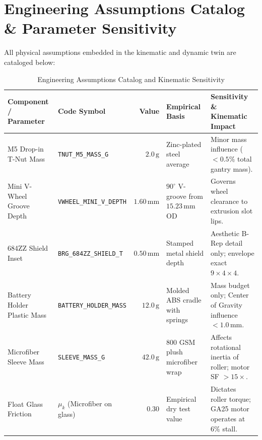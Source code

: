 \documentclass[10pt,a4paper]{article}
\begin{document}
\section{Engineering Assumptions Catalog \& Parameter Sensitivity}

All physical assumptions embedded in the kinematic and dynamic twin are cataloged below:

\begin{table}[H]
\centering
\small
\begin{tabularx}{\textwidth}{p{4.2cm} p{3.5cm} r p{4.2cm} X}
\toprule
\textbf{Component / Parameter} & \textbf{Code Symbol} & \textbf{Value} & \textbf{Empirical Basis} & \textbf{Sensitivity \& Kinematic Impact} \\
\midrule
M5 Drop-in T-Nut Mass & \texttt{TNUT\_M5\_MASS\_G} & $2.0\,\text{g}$ & Zinc-plated steel average & Minor mass influence ($<0.5\%$ total gantry mass). \\
Mini V-Wheel Groove Depth & \texttt{VWHEEL\_MINI\_V\_DEPTH} & $1.60\,\text{mm}$ & $90^\circ$ V-groove from $15.23\,\text{mm}$ OD & Governs wheel clearance to extrusion slot lips. \\
684ZZ Shield Inset & \texttt{BRG\_684ZZ\_SHIELD\_T} & $0.50\,\text{mm}$ & Stamped metal shield depth & Aesthetic B-Rep detail only; envelope exact $9 \times 4 \times 4$. \\
Battery Holder Plastic Mass & \texttt{BATTERY\_HOLDER\_MASS} & $12.0\,\text{g}$ & Molded ABS cradle with springs & Mass budget only; Center of Gravity influence $<1.0\,\text{mm}$. \\
Microfiber Sleeve Mass & \texttt{SLEEVE\_MASS\_G} & $42.0\,\text{g}$ & 800 GSM plush microfiber wrap & Affects rotational inertia of roller; motor SF $>15\times$. \\
Float Glass Friction & $\mu_k$ (Microfiber on glass) & $0.30$ & Empirical dry test value & Dictates roller torque; GA25 motor operates at $6\%$ stall. \\
\bottomrule
\end{tabularx}
\caption{Engineering Assumptions Catalog and Kinematic Sensitivity}
\label{tab:assumptions}
\end{table}

\end{document}
